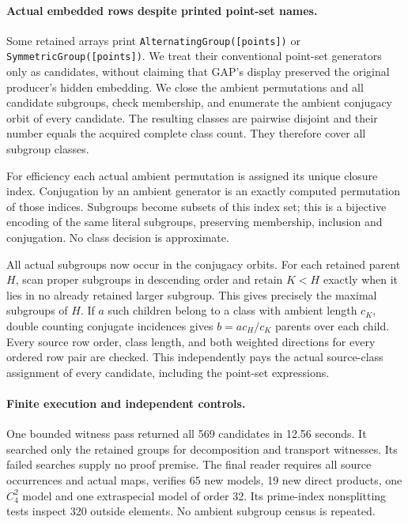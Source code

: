 \documentclass[11pt]{article}
\begin{document}
\paragraph{Actual embedded rows despite printed point-set names.}
Some retained arrays print \texttt{AlternatingGroup([points])} or
\texttt{SymmetricGroup([points])}. We treat their conventional point-set
generators only as candidates, without claiming that GAP's display
preserved the original producer's hidden embedding. We close the ambient
permutations and all candidate subgroups, check membership, and enumerate
the ambient conjugacy orbit of every candidate. The resulting classes
are pairwise disjoint and their number equals the acquired complete
class count. They therefore cover all subgroup classes.

For efficiency each actual ambient permutation is assigned its unique
closure index. Conjugation by an ambient generator is an exactly computed
permutation of those indices. Subgroups become subsets of this index set;
this is a bijective encoding of the same literal subgroups, preserving
membership, inclusion and conjugation. No class decision is approximate.

All actual subgroups now occur in the conjugacy orbits. For each retained
parent $H$, scan proper subgroups in descending order and retain $K<H$
exactly when it lies in no already retained larger subgroup. This gives
precisely the maximal subgroups of $H$. If $a$ such children belong to a
class with ambient length $c_K$, double counting conjugate incidences gives
$b=a c_H/c_K$ parents over each child. Every source row order, class length,
and both weighted directions for every ordered row pair are checked.
This independently pays the actual source-class assignment of every
candidate, including the point-set expressions.

\newpage
\paragraph{Finite execution and independent controls.}
One bounded witness pass returned all 569 candidates in 12.56 seconds.
It searched only the retained groups for decomposition and transport
witnesses. Its failed searches supply no proof premise. The final reader
requires all source occurrences and actual maps, verifies 65 new models,
19 new direct products, one $C_4^2$ model and one extraspecial model of
order 32. Its prime-index nonsplitting tests inspect 320 outside elements.
No ambient subgroup census is repeated.
\end{document}
